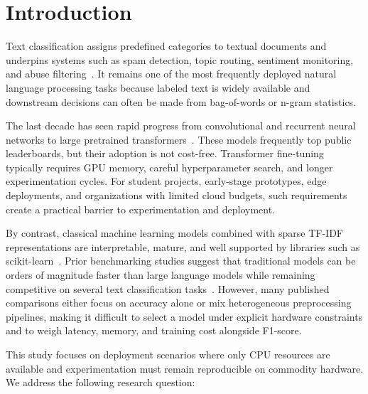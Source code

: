 \documentclass[pdflatex,sn-mathphys-num]{sn-jnl}
\begin{document}

\maketitle

\section{Introduction}\label{sec:introduction}

Text classification assigns predefined categories to textual documents and underpins systems such as spam detection, topic routing, sentiment monitoring, and abuse filtering~\cite{sebastiani2002machine,joachims1998text}. It remains one of the most frequently deployed natural language processing tasks because labeled text is widely available and downstream decisions can often be made from bag-of-words or n-gram statistics.

The last decade has seen rapid progress from convolutional and recurrent neural networks to large pretrained transformers~\cite{zhang2015character,devlin2019bert,brown2020language}. These models frequently top public leaderboards, but their adoption is not cost-free. Transformer fine-tuning typically requires GPU memory, careful hyperparameter search, and longer experimentation cycles. For student projects, early-stage prototypes, edge deployments, and organizations with limited cloud budgets, such requirements create a practical barrier to experimentation and deployment.

By contrast, classical machine learning models combined with sparse TF-IDF representations are interpretable, mature, and well supported by libraries such as scikit-learn~\cite{pedregosa2011scikit}. Prior benchmarking studies suggest that traditional models can be orders of magnitude faster than large language models while remaining competitive on several text classification tasks~\cite{wang2024atcbench}. However, many published comparisons either focus on accuracy alone or mix heterogeneous preprocessing pipelines, making it difficult to select a model under explicit hardware constraints and to weigh latency, memory, and training cost alongside F1-score.

This study focuses on deployment scenarios where only CPU resources are available and experimentation must remain reproducible on commodity hardware. We address the following research question:
\end{document}
